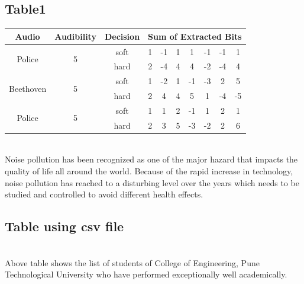 \documentclass{article}
\begin{document}
\subsection{Table1}
\begin{tabular}{|c|c|c|c|c|c|c|c|c|c|}
\hline \hline
Audio & Audibility & Decision  & \multicolumn{7}{|c|}{Sum of Extracted Bits}\\
\hline
\multirow{2}{*}{Police} & \multirow{2}{*}{5} & soft & 1 & -1 & 1 & 1 & -1 & -1 & 1\\ 
&  & hard & 2 & -4 & 4 & 4 & -2 & -4 & 4\\ \hline
\multirow{2}{*}{Beethoven} & \multirow{2}{*}{5} & soft & 1 & -2 & 1 & -1 & -3 & 2 & 5\\
 &  & hard & 2 & 4 & 4 & 5 & 1 & -4 & -5\\ \hline
\multirow{2}{*}{Police} & \multirow{2}{*}{5} & soft & 1 & 1 & 2 & -1 & 1 & 2 & 1\\
 &  & hard & 2 & 3 & 5 & -3 & -2 & 2 & 6\\
\hline \hline
\end{tabular}
\vspace{1cm}
\\
Noise pollution has been recognized as one of the major hazard that impacts the quality of life all around the world. Because of the rapid increase in technology, noise pollution has reached to a disturbing level over the years which needs to be studied and controlled to avoid different health effects.
\subsection{Table using csv file}
\vspace{0.7cm}
\\
Above table shows the list of students of College of Engineering, Pune Technological University who have performed exceptionally well academically.
\end{document}
